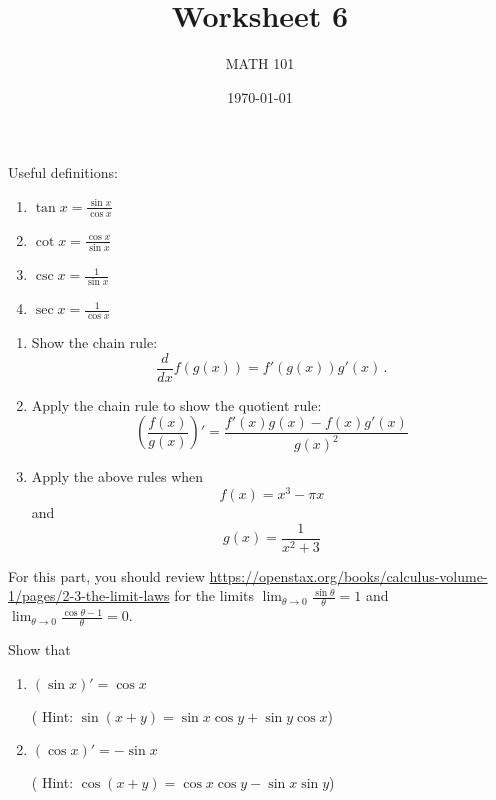 \documentclass[12pt]{amsart}
\title{ Worksheet 6}
\author{MATH 101}
\date{\today}
\begin{document}
\maketitle

Useful definitions:

\begin{enumerate}
	\item $\displaystyle \tan x = \frac{\sin x}{\cos x}$
	\item $\displaystyle \cot x = \frac{\cos x}{\sin x}$
	\item $\displaystyle \csc x = \frac{1}{\sin x}$
	\item $\displaystyle \sec x = \frac{1}{\cos x}$
\end{enumerate}




\begin{question}
	\begin{enumerate}
		\item Show the chain rule:
		      \begin{equation*}
			      \frac{d}{dx} f(g(x)) = f'(g(x)) g'(x) \,.
		      \end{equation*}
		      \vspace{7cm}

		\item Apply the chain rule to show the quotient rule:
		      \begin{equation*}
			      \left( \frac{f(x)}{g(x)}  \right)' = \frac{ f'(x) g(x) - f(x) g'(x)}{g(x)^2}
		      \end{equation*}
		      \vspace{5cm}


		\item Apply the above rules when
		      $$f(x) = x^3 -\pi x$$
		      and
		      $$ g(x) = \frac{1}{x^2 + 3} $$
		      \vspace{5cm}

	\end{enumerate}
\end{question}
\newpage

\begin{question}
	For this part, you should review \url{https://openstax.org/books/calculus-volume-1/pages/2-3-the-limit-laws}
	for the limits $\lim_{\theta \to 0} \frac{\sin \theta }{\theta} = 1$
	and
	$\lim_{\theta \to 0} \frac{\cos \theta - 1}{\theta} = 0$.

	Show that
	\begin{enumerate}
		\item $(\sin x)' = \cos x$

		      ( Hint: $\sin(x + y) = \sin x \cos y + \sin y \cos x$)
		      \vspace{5cm}

		\item $(\cos x)' = - \sin x$

		      ( Hint: $\cos(x + y) = \cos x \cos y - \sin x \sin y$)
		      \vspace{5cm}
	\end{enumerate}
\end{question}
\end{document}
